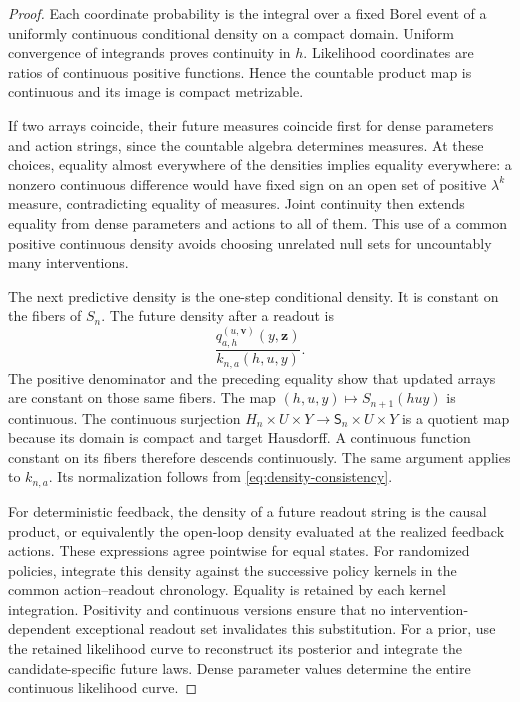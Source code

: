 \begin{proof}
Each coordinate probability is the integral over a fixed Borel event of a uniformly continuous conditional density on a compact domain. Uniform convergence of integrands proves continuity in $h$. Likelihood coordinates are ratios of continuous positive functions. Hence the countable product map is continuous and its image is compact metrizable.

If two arrays coincide, their future measures coincide first for dense parameters and action strings, since the countable algebra determines measures. At these choices, equality almost everywhere of the densities implies equality everywhere: a nonzero continuous difference would have fixed sign on an open set of positive $\lambda^k$ measure, contradicting equality of measures. Joint continuity then extends equality from dense parameters and actions to all of them. This use of a common positive continuous density avoids choosing unrelated null sets for uncountably many interventions.

The next predictive density is the one-step conditional density. It is constant on the fibers of $S_n$. The future density after a readout is
\[
 \frac{q_{a,h}^{(u,\mathbf v)}(y,\mathbf z)}{k_{n,a}(h,u,y)}.
\]
The positive denominator and the preceding equality show that updated arrays are constant on those same fibers. The map $(h,u,y)\mapsto S_{n+1}(huy)$ is continuous. The continuous surjection
$H_n\times U\times Y\to\mathsf S_n\times U\times Y$ is a quotient map because its domain is compact and target Hausdorff. A continuous function constant on its fibers therefore descends continuously. The same argument applies to $k_{n,a}$. Its normalization follows from \eqref{eq:density-consistency}.

For deterministic feedback, the density of a future readout string is the causal product, or equivalently the open-loop density evaluated at the realized feedback actions. These expressions agree pointwise for equal states. For randomized policies, integrate this density against the successive policy kernels in the common action--readout chronology. Equality is retained by each kernel integration. Positivity and continuous versions ensure that no intervention-dependent exceptional readout set invalidates this substitution. For a prior, use the retained likelihood curve to reconstruct its posterior and integrate the candidate-specific future laws. Dense parameter values determine the entire continuous likelihood curve.
\end{proof}

